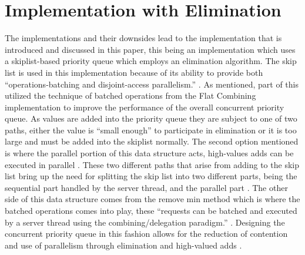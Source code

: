 \documentclass[10pt]{asme2ej}
\begin{document}
\section{Implementation with Elimination}
The implementations and their downsides lead to the implementation that is introduced and discussed in this paper, this being an implementation which uses a skiplist-based priority queue which employs an elimination algorithm. The skip list is used in this implementation because of its ability to provide both “operations-batching and disjoint-access parallelism.” \cite{latex}. As mentioned, part of this utilized the technique of batched operations from the Flat Combining implementation to improve the performance of the overall concurrent priority queue. As values are added into the priority queue they are subject to one of two paths, either the value is “small enough” to participate in elimination or it is too large and must be added into the skiplist normally. The second option mentioned is where the parallel portion of this data structure acts, high-values adds can be executed in parallel \cite{latex}. These two different paths that arise from adding to the skip list bring up the need for splitting the skip list into two different parts, being the sequential part handled by the server thread, and the parallel part \cite{latex}. The other side of this data structure comes from the remove min method which is where the batched operations comes into play, these “requests can be batched and executed by a server thread using the combining/delegation paradigm.” \cite{latex}. Designing the concurrent priority queue in this fashion allows for the reduction of contention and use of parallelism through elimination and high-valued adds \cite{latex}.
\end{document}
